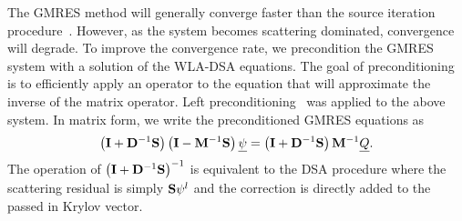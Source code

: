 The GMRES method will generally converge faster than the source iteration
procedure~\cite{morel_dsa}.  However, as the system becomes scattering dominated,
convergence will degrade.  To improve the convergence rate, we precondition the GMRES
system with a solution of the WLA-DSA equations.  The goal of preconditioning is to efficiently apply an
operator to the equation that will approximate the inverse of the matrix operator. Left
preconditioning~\cite{saad} was applied to the above system.  In matrix form, we write the preconditioned GMRES equations as
\begin{equation}
    \left(\mathbf{I} + \mathbf{D}^{-1} \mathbf{S}\right)\left(\mathbf{I} - \mathbf{M}^{-1} \mathbf{S} \right) \underline{\psi} = \left( \mathbf{I} + \mathbf{D}^{-1}\mathbf{S}\right) \mathbf{M}^{-1}\underline{Q}.
\end{equation}
The operation of $\left(\mathbf{I} + \mathbf{D}^{-1} \mathbf{S}\right)^{-1}$ is equivalent to the DSA
procedure where the scattering residual is simply $\mathbf{S} \psi^{l}$ and the correction is
directly added to the passed in Krylov vector.


